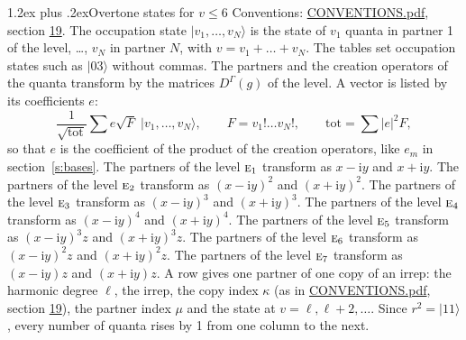 \documentclass[10pt,a4paper]{article}
\makeatletter
\renewcommand\section{\@startsection{section}{1}{\z@}{-3ex plus -1ex minus -.2ex}%
  {1.2ex plus .2ex}{\normalfont\large\sffamily\bfseries\color{parttitle}}}
\numberwithin{equation}{section}
\newcommand{\irr}[1]{\text{\normalfont\scshape #1}}
\newcommand{\iunit}{\mathrm{i}}
\newcommand{\repD}[1]{D^{#1}}
\newcommand{\mult}{\kappa}
\newcommand{\intx}{\mu}
\newcommand{\occ}[1]{\lvert #1\rangle}
\makeatother
\begin{document}
\section{Overtone states for \texorpdfstring{$v \le 6$}{v \textleq\ 6}}\label{s:overtone_states}
Conventions: \href{../../CONVENTIONS.pdf}{CONVENTIONS.pdf}, section \href{../../CONVENTIONS.pdf\#conv.19}{19}.
\leavevmode\label{n:vector.occupation}\label{n:local.quanta.partner}\label{n:local.weight.occupation}The occupation state $\occ{v_1, \dots, v_N}$ is the state of $v_1$ quanta in partner 1 of the level, \dots, $v_N$ in partner $N$, with $v = v_1 + \dots + v_N$. The tables set occupation states such as $\occ{03}$ without commas. The partners and the creation operators of the quanta transform by the matrices $\repD{\Gamma}(g)$ of the level. A vector is listed by its coefficients $e$:
\begin{equation}\label{e:occupation}\frac{1}{\sqrt{\mathrm{tot}}}\sum e\sqrt{F}\;\occ{v_1, \dots, v_N},\qquad F = v_1!\dots v_N!,\qquad \mathrm{tot} = \sum |e|^2F,\end{equation}
so that $e$ is the coefficient of the product of the creation operators, like $e_m$ in section~\ref{s:bases}. The partners of the level $\irr{e}_{1}$ transform as $x - \iunit y$ and $x + \iunit y$. The partners of the level $\irr{e}_{2}$ transform as $(x - \iunit y)^{2}$ and $(x + \iunit y)^{2}$. The partners of the level $\irr{e}_{3}$ transform as $(x - \iunit y)^{3}$ and $(x + \iunit y)^{3}$. The partners of the level $\irr{e}_{4}$ transform as $(x - \iunit y)^{4}$ and $(x + \iunit y)^{4}$. The partners of the level $\irr{e}_{5}$ transform as $(x - \iunit y)^{3} z$ and $(x + \iunit y)^{3} z$. The partners of the level $\irr{e}_{6}$ transform as $(x - \iunit y)^{2} z$ and $(x + \iunit y)^{2} z$. The partners of the level $\irr{e}_{7}$ transform as $(x - \iunit y) z$ and $(x + \iunit y) z$. A row gives one partner of one copy of an irrep: the harmonic degree $\ell$, the irrep, the copy index $\mult$ (as in \href{../../CONVENTIONS.pdf}{CONVENTIONS.pdf}, section \href{../../CONVENTIONS.pdf\#conv.19}{19}), the partner index $\intx$ and the state at $v = \ell, \ell + 2, \dots$. Since $r^2 = \occ{11}$, every number of quanta rises by 1 from one column to the next.
\end{document}
